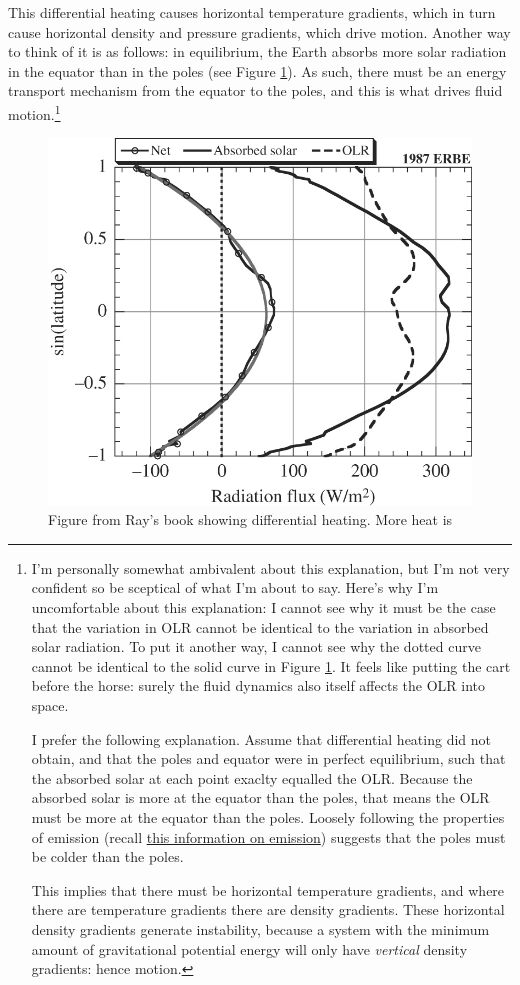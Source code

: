 This differential heating causes horizontal temperature gradients, which in turn cause horizontal density and pressure gradients, which drive motion. Another way to think of it is as follows: in equilibrium, the Earth absorbs more solar radiation in the equator than in the poles (see Figure \ref{Diff Heating}). As such, there must be an energy transport mechanism from the equator to the poles, and this is what drives fluid motion.\footnote{
    I'm personally somewhat ambivalent about this explanation, but I'm not very confident so be sceptical of what I'm about to say. Here's why I'm uncomfortable about this explanation: I cannot see why it must be the case that the variation in OLR cannot be identical to the variation in absorbed solar radiation. To put it another way, I cannot see why the dotted curve cannot be identical to the solid curve in Figure \ref{Diff Heating}. It feels like putting the cart before the horse: surely the fluid dynamics also itself affects the OLR into space.

    I prefer the following explanation. Assume that differential heating did not obtain, and that the poles and equator were in perfect equilibrium, such that the absorbed solar at each point exaclty equalled the OLR. Because the absorbed solar is more at the equator than the poles, that means the OLR must be more at the equator than the poles. Loosely following the properties of emission (recall  \hyperref[Emission Box]{this information on emission}) suggests that the poles must be colder than the poles. 

    This implies that there must be horizontal temperature gradients, and where there are temperature gradients there are density gradients. These horizontal density gradients generate instability, because a system with the minimum amount of gravitational potential energy will only have \textit{vertical} density gradients: hence motion.
}

\begin{figure}[H]
    \centering
    \includegraphics[width=0.5\linewidth]{Figures/GFD/Diff Heating.jpg}
    \caption{Figure from Ray's book showing differential heating. More heat is }
    \label{Diff Heating}
\end{figure}

